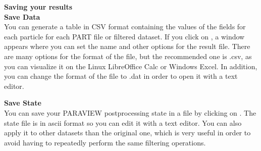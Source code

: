 \textbf{Saving your results} \\

\textbf{Save Data} \\
You can generate a table in CSV format containing the values of the 
fields for each particle for each PART file or filtered dataset. 
If you click on , a window appears where 
you can set the name and other options for the result file. 
There are many options for the format of the file, but the recommended 
one is .csv, as you can visualize it on the Linux LibreOffice Calc 
or Windows Excel. In addition, 
you can change the format of the file to .dat in order to open 
it with a text editor. 

\textbf{Save State} \\
You can save your PARAVIEW postprocessing state in a file by
clicking on . The state file is in ascii
format so you can edit it with a text editor.
You can also apply it to other datasets than the original one, 
which is very useful in order to avoid having to repeatedly
perform the same filtering operations.
